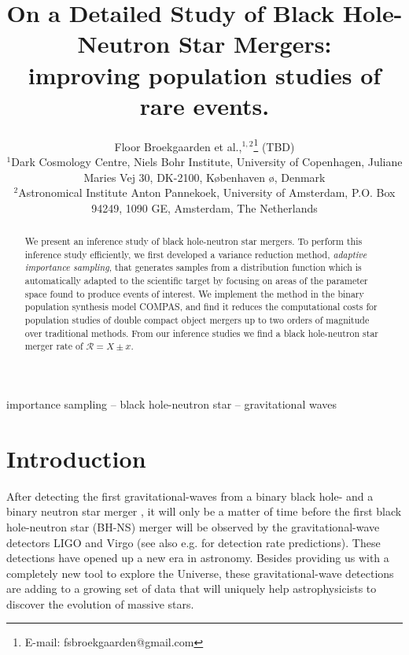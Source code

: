 \documentclass[a4paper,fleqn,usenatbib]{mnras}
\title[Black Hole - Neutron Star ]{On a Detailed Study of Black Hole-Neutron Star Mergers: \\ improving  population studies of rare events.}
\author[]{Floor Broekgaarden et al.,$^{1,2}$\thanks{E-mail: fsbroekgaarden@gmail.com}
(TBD)
\\
$^{1}$Dark Cosmology Centre, Niels Bohr Institute, University of
Copenhagen, Juliane Maries Vej 30, DK-2100, K\o benhaven \o,
Denmark\\
$^{2}$Astronomical Institute Anton Pannekoek, University of Amsterdam, P.O. Box 94249, 1090 GE, Amsterdam, The Netherlands \\
}
\newcommand\rate{\mathcal{R}}
\newcommand\ratezero{X}
\newcommand\errorratezero{x}
\begin{document}
\label{firstpage}
\pagerange{\pageref{firstpage}--\pageref{lastpage}}
\maketitle

\begin{abstract}
We present an inference study of black hole-neutron star mergers. To perform this inference study efficiently, we first developed a variance reduction method, \emph{adaptive importance sampling}, that generates samples from a distribution function which is automatically adapted to the scientific target by focusing on areas of the parameter space found to produce events of interest. We implement the method in the binary population synthesis model COMPAS, and find it reduces the computational costs for population studies of double compact object mergers up to two orders of magnitude over traditional methods. From our inference studies we find a black hole-neutron star merger rate of $\rate  =  \ratezero \pm \errorratezero $. 
\end{abstract}

\begin{keywords}
importance sampling -- black hole-neutron star -- gravitational waves
\end{keywords}









\section{Introduction}
\label{sec:introduction}

After detecting the first gravitational-waves from a binary black hole- and a binary neutron star merger \citep{abbott2016observation,abbott2017gw170817},
it will only be a matter of time before the first black hole-neutron star (BH-NS) merger will be observed by the gravitational-wave detectors LIGO and Virgo (see also e.g. \citealt{abbott2018prospects} for detection rate predictions).
These detections  have opened up a new era in astronomy. Besides providing us with a completely new tool to explore the Universe, these gravitational-wave detections are adding to a growing set of data that will uniquely help astrophysicists to discover the evolution of massive stars. 
\end{document}
